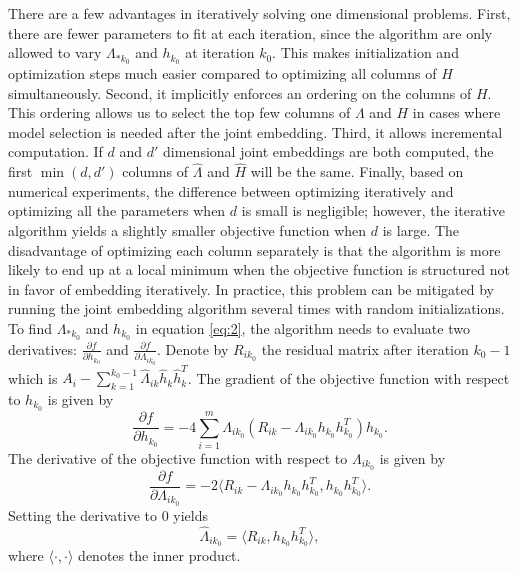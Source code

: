 \documentclass[10pt,journal,compsoc]{IEEEtran}
\begin{document}
\noindent There are a few advantages in iteratively solving one dimensional problems. First, there are fewer parameters to fit at each iteration, since the algorithm are only allowed to vary $\Lambda_{*k_0}$ and $h_{k_0}$ at iteration $k_0$. This makes initialization and optimization steps much easier compared to optimizing all columns of $H$ simultaneously. Second, it implicitly enforces an ordering on the columns of $H$. This ordering allows us to select the top few columns of $\Lambda$ and $H$ in cases where model selection is needed after the joint embedding. Third, it allows incremental computation. If $d$ and $d'$ dimensional joint embeddings are both computed, the first $\min(d,d')$ columns of $\hat{\Lambda}$ and $\hat{H}$ will be the same. Finally, based on numerical experiments, the difference between optimizing iteratively and optimizing all the parameters when $d$ is small is negligible; however, the iterative algorithm yields a slightly smaller objective function when $d$ is large. The disadvantage of optimizing each column separately is that the algorithm is more likely to end up at a local minimum when the objective function is structured not in favor of embedding iteratively. In practice, this problem can be mitigated by running the joint embedding algorithm several times with random initializations. \\ 

\noindent To find $\Lambda_{*k_0}$ and $h_{k_0}$ in equation \eqref{eq:2}, the algorithm needs to evaluate two derivatives: $\frac{\partial f}{\partial h_{k_0}}$ and $\frac{\partial f}{\partial \Lambda_{i k_0}}$. Denote by $R_{ik_0}$ the residual matrix after iteration $k_0-1$ which is $A_i- \sum\limits_{k=1}^{k_0-1}\hat{\Lambda}_{ik} \hat{h}_{k} \hat{h}_{k}^T$. The gradient of the objective function with respect to $h_{k_0}$ is given by
\begin{equation} \label{eq:3}
\frac{\partial f}{\partial h_{k_0}} = -4\sum\limits_{i=1}^{m}  \Lambda_{ik_0} (R_{ik}-\Lambda_{ik_0} h_{k_0} h_{k_0}^T)  h_{k_0}.
\end{equation}
The derivative of the objective function with respect to $\Lambda_{i k_0}$ is given by
\[\frac{\partial f}{\partial \Lambda_{i k_0}}= -2 \langle R_{ik}-\Lambda_{ik_0} h_{k_0} h_{k_0}^T,h_{k_0} h_{k_0}^T\rangle.\]
Setting the derivative to $0$ yields
\begin{equation}  \label{eq:4}
\hat{\Lambda}_{i k_0} = \langle R_{ik}, h_{k_0} h_{k_0}^T \rangle,
\end{equation}
where $\langle \cdot , \cdot \rangle$ denotes the inner product. \\
\end{document}
